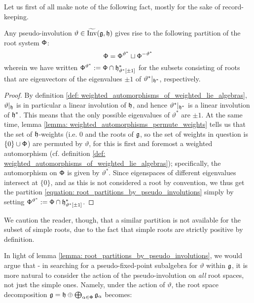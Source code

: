         Let us first of all make note of the following fact, mostly for the sake of record-keeping.
        \begin{lemma} \label{lemma: root_partitions_by_pseudo_involutions}
            Any pseudo-involution $\vartheta \in \widetilde{\operatorname{Inv}}(\mathfrak{g}, \mathfrak{h})$ gives rise to the following partition of the root system $\mathsf{\Phi}$:
                \begin{equation} \label{equation: root_partitions_by_pseudo_involutions}
                    \mathsf{\Phi} = \mathsf{\Phi}^{\vartheta^*} \sqcup \mathsf{\Phi}^{-\vartheta^*}
                \end{equation}
            wherein we have written $\mathsf{\Phi}^{\vartheta^*} := \mathsf{\Phi} \cap \mathfrak{h}^*_{\vartheta^*[\pm 1]}$ for the subsets consisting of roots that are eigenvectors of the eigenvalues $\pm 1$ of $\vartheta^*|_{\mathfrak{h}^*}$, respectively.
        \end{lemma}
            \begin{proof}
                By definition \ref{def: weighted_automorphisms_of_weighted_lie_algebras}, $\vartheta|_{\mathfrak{h}}$ is in particular a linear involution of $\mathfrak{h}$, and hence $\vartheta^*|_{\mathfrak{h}^*}$ is a linear involution of $\mathfrak{h}^*$. This means that the only possible eigenvalues of $\vartheta^*$ are $\pm 1$. At the same time, lemma \ref{lemma: weighted_automorphisms_permute_weights} tells us that the set of $\mathfrak{h}$-weights (i.e. $0$ and the roots of $\mathfrak{g}$, so the set of weights in question is $\{0\} \cup \mathsf{\Phi}$) are permuted by $\vartheta$, for this is first and foremost a weighted automorphism (cf. definition \ref{def: weighted_automorphisms_of_weighted_lie_algebras}); specifically, the automorphism on $\mathsf{\Phi}$ is given by $\vartheta^*$. Since eigenspaces of different eigenvalues intersect at $\{0\}$, and as this is not considered a root by convention, we thus get the partition \eqref{equation: root_partitions_by_pseudo_involutions} simply by setting $\mathsf{\Phi}^{\vartheta^*} := \mathsf{\Phi} \cap \mathfrak{h}^*_{\vartheta^*[\pm 1]}$.
            \end{proof}
        \begin{remark}
            We caution the reader, though, that a similar partition is not available for the subset of simple roots, due to the fact that simple roots are strictly positive by definition.
        \end{remark}
        In light of lemma \ref{lemma: root_partitions_by_pseudo_involutions}, we would argue that - in searching for a pseudo-fixed-point subalgebra for $\vartheta$ within $\mathfrak{g}$, it is more natural to consider the action of the pseudo-involution on \textit{all} root spaces, not just the simple ones. Namely, under the action of $\vartheta$, the root space decomposition $\mathfrak{g} = \mathfrak{h} \oplus \bigoplus_{\alpha \in \mathsf{\Phi}} \mathfrak{g}_{\alpha}$ becomes:

